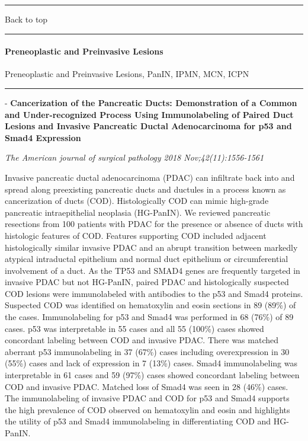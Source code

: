 \documentclass[]{article}
\let\oldparagraph\paragraph
\renewcommand{\paragraph}[1]{\oldparagraph{#1}\mbox{}}
\begin{document}
\begin{center}\rule{0.5\linewidth}{\linethickness}\end{center}

Back to top

\begin{center}\rule{0.5\linewidth}{\linethickness}\end{center}

\pagebreak

\hypertarget{preneoplastic-and-preinvasive-lesions}{%
\paragraph{Preneoplastic and Preinvasive
Lesions}\label{preneoplastic-and-preinvasive-lesions}}

Preneoplastic and Preinvasive Lesions, PanIN, IPMN, MCN, ICPN

\begin{center}\rule{0.5\linewidth}{\linethickness}\end{center}

 - \textbf{Cancerization of the Pancreatic Ducts: Demonstration of a
Common and Under-recognized Process Using Immunolabeling of Paired Duct
Lesions and Invasive Pancreatic Ductal Adenocarcinoma for p53 and Smad4
Expression}

\emph{The American journal of surgical pathology 2018
Nov;42(11):1556-1561}

Invasive pancreatic ductal adenocarcinoma (PDAC) can infiltrate back
into and spread along preexisting pancreatic ducts and ductules in a
process known as cancerization of ducts (COD). Histologically COD can
mimic high-grade pancreatic intraepithelial neoplasia (HG-PanIN). We
reviewed pancreatic resections from 100 patients with PDAC for the
presence or absence of ducts with histologic features of COD. Features
supporting COD included adjacent histologically similar invasive PDAC
and an abrupt transition between markedly atypical intraductal
epithelium and normal duct epithelium or circumferential involvement of
a duct. As the TP53 and SMAD4 genes are frequently targeted in invasive
PDAC but not HG-PanIN, paired PDAC and histologically suspected COD
lesions were immunolabeled with antibodies to the p53 and Smad4
proteins. Suspected COD was identified on hematoxylin and eosin sections
in 89 (89\%) of the cases. Immunolabeling for p53 and Smad4 was
performed in 68 (76\%) of 89 cases. p53 was interpretable in 55 cases
and all 55 (100\%) cases showed concordant labeling between COD and
invasive PDAC. There was matched aberrant p53 immunolabeling in 37
(67\%) cases including overexpression in 30 (55\%) cases and lack of
expression in 7 (13\%) cases. Smad4 immunolabeling was interpretable in
61 cases and 59 (97\%) cases showed concordant labeling between COD and
invasive PDAC. Matched loss of Smad4 was seen in 28 (46\%) cases. The
immunolabeling of invasive PDAC and COD for p53 and Smad4 supports the
high prevalence of COD observed on hematoxylin and eosin and highlights
the utility of p53 and Smad4 immunolabeling in differentiating COD and
HG-PanIN.
\end{document}
